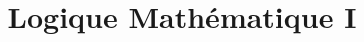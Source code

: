 \documentclass[a4paper, 12pt]{report}
\title{Logique Mathématique I}
\author{}
\begin{document}
\maketitle

\begin{abstract}

\end{abstract}

\tableofcontents




\end{document}

